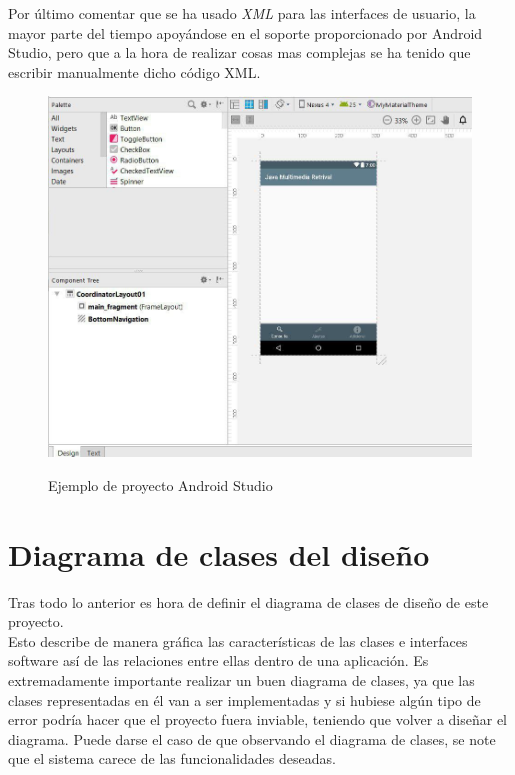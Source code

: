 Por último comentar que se ha usado \textit{XML} para las interfaces de usuario, la mayor parte del tiempo apoyándose en el soporte proporcionado por Android Studio, pero que a la hora de realizar cosas mas complejas se ha tenido que escribir manualmente dicho código XML.

\begin{figure}[H] %
\centering
\includegraphics[scale=0.6]{imagenes/interfaz-android-studio.jpg}  %
\label{interfaz-android-studio.jpg}
\caption{Ejemplo de proyecto Android Studio}
\end{figure}


\section{Diagrama de clases del diseño}

Tras todo lo anterior es hora de definir el diagrama de clases de diseño de este proyecto.\\

Esto describe de manera gráfica las características de las clases e interfaces software así de las relaciones entre ellas dentro de una aplicación. Es extremadamente importante realizar un buen diagrama de clases, ya que las clases representadas en él van a ser implementadas y si hubiese algún tipo de error podría hacer que el proyecto fuera inviable, teniendo que volver a diseñar el diagrama. Puede darse el caso de que observando el diagrama de clases, se note que el sistema carece de las funcionalidades deseadas.

